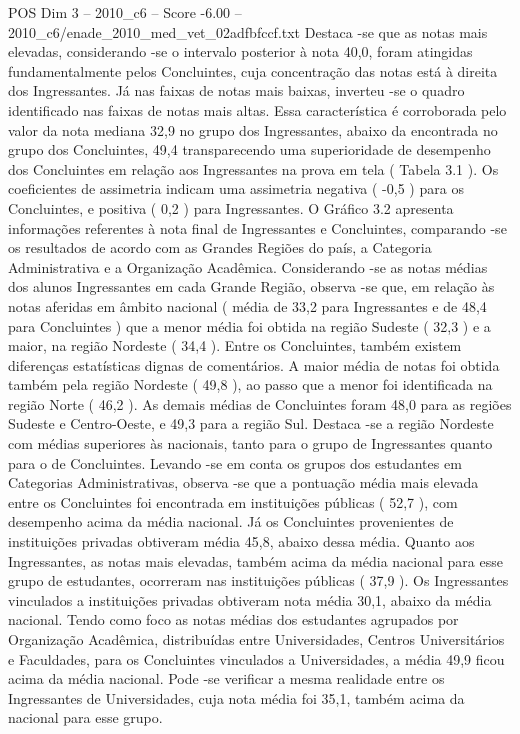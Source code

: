 \begin{textsample}{POS Dim 3 – 2010\_c6 – Score -6.00 – 2010\_c6/enade\_2010\_med\_vet\_02adfbfccf.txt}
Destaca -se que as notas mais elevadas, considerando -se o intervalo posterior à nota 40,0, foram atingidas fundamentalmente pelos Concluintes, cuja concentração das notas está à direita dos Ingressantes.
Já nas faixas de notas mais baixas, inverteu -se o quadro identificado nas faixas de notas mais altas.
Essa característica é corroborada pelo valor da nota mediana 32,9 no grupo dos Ingressantes, abaixo da encontrada no grupo dos Concluintes, 49,4 transparecendo uma superioridade de desempenho dos Concluintes em relação aos Ingressantes na prova em tela ( Tabela 3.1 ).
Os coeficientes de assimetria indicam uma assimetria negativa ( -0,5 ) para os Concluintes, e positiva ( 0,2 ) para Ingressantes.
O Gráfico 3.2 apresenta informações referentes à nota final de Ingressantes e Concluintes, comparando -se os resultados de acordo com as Grandes Regiões do país, a Categoria Administrativa e a Organização Acadêmica.
Considerando -se as notas médias dos alunos Ingressantes em cada Grande Região, observa -se que, em relação às notas aferidas em âmbito nacional ( média de 33,2 para Ingressantes e de 48,4 para Concluintes ) que a menor média foi obtida na região Sudeste ( 32,3 ) e a maior, na região Nordeste ( 34,4 ).
Entre os Concluintes, também existem diferenças estatísticas dignas de comentários.
A maior média de notas foi obtida também pela região Nordeste ( 49,8 ), ao passo que a menor foi identificada na região Norte ( 46,2 ).
As demais médias de Concluintes foram 48,0 para as regiões Sudeste e Centro-Oeste, e 49,3 para a região Sul.
Destaca -se a região Nordeste com médias superiores às nacionais, tanto para o grupo de Ingressantes quanto para o de Concluintes.
Levando -se em conta os grupos dos estudantes em Categorias Administrativas, observa -se que a pontuação média mais elevada entre os Concluintes foi encontrada em instituições públicas ( 52,7 ), com desempenho acima da média nacional.
Já os Concluintes provenientes de instituições privadas obtiveram média 45,8, abaixo dessa média.
Quanto aos Ingressantes, as notas mais elevadas, também acima da média nacional para esse grupo de estudantes, ocorreram nas instituições públicas ( 37,9 ).
Os Ingressantes vinculados a instituições privadas obtiveram nota média 30,1, abaixo da média nacional.
Tendo como foco as notas médias dos estudantes agrupados por Organização Acadêmica, distribuídas entre Universidades, Centros Universitários e Faculdades, para os Concluintes vinculados a Universidades, a média 49,9 ficou acima da média nacional.
Pode -se verificar a mesma realidade entre os Ingressantes de Universidades, cuja nota média foi 35,1, também acima da nacional para esse grupo.

\end{textsample}
